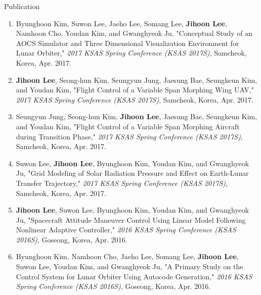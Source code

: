 \documentclass{resume}
\begin{document}
\begin{rSection}{Publication}
\begin{enumerate}
		\item Byunghoon Kim, Suwon Lee, Jaeho Lee, Somang Lee, \textbf{\color{coolblack}Jihoon Lee}, Namhoon Cho, Youdan Kim, and Gwanghyeok Ju, "Conceptual Study of an AOCS Simulator and Three Dimensional Visualization Environment for Lunar Orbiter," \textit{2017 KSAS Spring Conference (KSAS 2017S)}, Samcheok, Korea, Apr. 2017. 
		
		\item \textbf{\color{coolblack}Jihoon Lee}, Seong-hun Kim, Seungyun Jung, Jaesung Bae, Seungkeun Kim, and Youdan Kim, "Flight Control of a Variable Span Morphing Wing UAV," \textit{2017 KSAS Spring Conference (KSAS 2017S)}, Samcheok, Korea, Apr. 2017. 
		
		\item Seungyun Jung, Seong-hun Kim, \textbf{\color{coolblack}Jihoon Lee}, Jaesung Bae, Seungkeun Kim, and Youdan Kim, "Flight Control of a Variable Span Morphing Aircraft during Transition Phase," \textit{2017 KSAS Spring Conference (KSAS 2017S)}, Samcheok, Korea, Apr. 2017. 
		
		\item Suwon Lee, \textbf{\color{coolblack}Jihoon Lee}, Byunghoon Kim, Youdan Kim, and Gwanghyeok Ju, "Grid Modeling of Solar Radiation Pressure and Effect on Earth-Lunar Transfer Trajectory," \textit{2017 KSAS Spring Conference (KSAS 2017S)}, Samcheok, Korea, Apr. 2017. 
		
		\item \textbf{\color{coolblack}Jihoon Lee}, Suwon Lee, Byunghoon Kim, Youdan Kim, and Gwanghyeok Ju, "Spacecraft Attitude Maneuver Control Using Linear Model Following Nonlinear Adaptive Controller," \textit{2016 KSAS Spring Conference (KSAS 2016S)}, Goseong, Korea, Apr. 2016. 
		
		\item Byunghoon Kim, Namhoon Cho, Jaeho Lee, Somang Lee, \textbf{\color{coolblack}Jihoon Lee}, Suwon Lee, Youdan Kim, and Gwanghyeok Ju, "A Primary Study on the Control System for Lunar Orbiter Using Autocode Generation," \textit{2016 KSAS Spring Conference (KSAS 2016S)}, Goseong, Korea, Apr. 2016. 
		

\end{enumerate}
\end{rSection}
\end{document}
